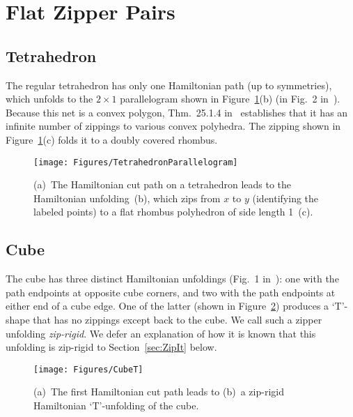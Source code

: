 \pdfoutput=1  \documentclass[]{article}
\newcommand{\figlab}[1]{\label{fig:#1}}
\newcommand{\secref}[1]{\ref{sec:#1}}
\newcommand{\figref}[1]{\ref{fig:#1}}
\begin{document}
\section{Flat Zipper Pairs}
\subsection{Tetrahedron}
The regular tetrahedron has only one Hamiltonian path (up to
symmetries),
which unfolds to the $2 \times 1$ parallelogram
shown in Figure~\figref{TetrahedronParallelogram}(b)
(in Fig.~2 in~\cite{lddss-zupc-10}).
Because this net is a convex polygon,
Thm.~25.1.4 in~\cite{do-gfalop-07} establishes that it has an infinite
number of zippings to various convex polyhedra.
The zipping shown in Figure~\figref{TetrahedronParallelogram}(c)
folds it to a doubly covered rhombus.
\begin{figure}[htbp]
\centering
\texttt{[image: Figures/TetrahedronParallelogram]}
\caption{(a)~The Hamiltonian cut path on a tetrahedron
leads to the Hamiltonian unfolding~(b),
which zips from $x$ to $y$ (identifying the labeled points) to 
a flat rhombus polyhedron of side length 1~(c).}
\figlab{TetrahedronParallelogram}
\end{figure}


\subsection{Cube}
The cube has three distinct Hamiltonian unfoldings
(Fig.~1 in~\cite{lddss-zupc-10}): one with the path endpoints at
opposite cube corners, and two with the path endpoints at either
end of a cube edge.
One of the latter (shown in Figure~\figref{CubeT}) produces a
`T'-shape
that has no zippings except back to
the cube.
We call such a zipper unfolding \emph{zip-rigid}.
We defer an explanation of how it is known that this
unfolding is zip-rigid to Section~\secref{ZipIt} below.
\begin{figure}[htbp]
\centering
\texttt{[image: Figures/CubeT]}
\caption{(a)~The first Hamiltonian cut path
leads to (b)~a zip-rigid Hamiltonian `T'-unfolding of the cube.}
\figlab{CubeT}
\end{figure}
\end{document}

